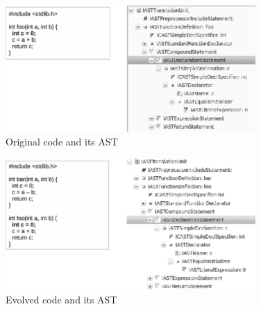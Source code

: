 \documentclass[runningheads,a4paper]{llncs}
\begin{document}
\begin{figure}
\begin{center}
\includegraphics[width=0.85\textwidth]{ast1}
\caption{Original code and its AST}
\label{fig:ast1}
\end{center}
\end{figure}

\begin{figure}
\begin{center}
\includegraphics[width=0.85\textwidth]{ast2}
\caption{Evolved code and its AST}
\label{fig:ast2}
\end{center}
\end{figure}
\end{document}

